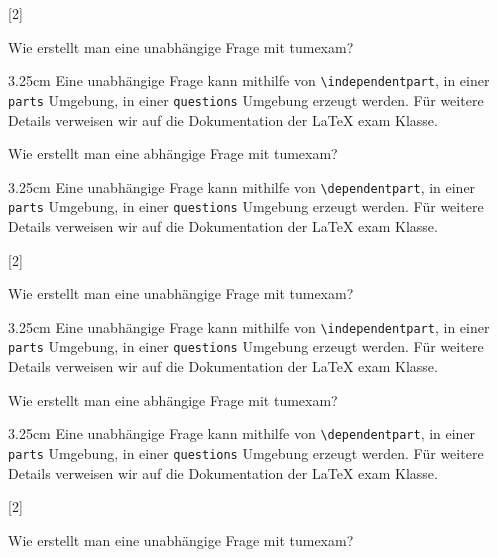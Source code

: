 \documentclass[german, @CLASSOPTIONS@]{tumexam}
\begin{document}
\begin{questions}
\begin{parts}
  \end{parts}
  \clearpage
  [2]
  \begin{parts}
    \independentpart
    Wie erstellt man eine unabhängige Frage mit tumexam?
    \begin{solutionbox}{3.25cm}
      Eine unabhängige Frage kann mithilfe von \texttt{\textbackslash{independentpart}}, in einer \texttt{parts} Umgebung, in einer \texttt{questions} Umgebung erzeugt werden. Für weitere Details verweisen wir auf die Dokumentation der \LaTeX{} exam Klasse.
    \end{solutionbox}
    \dependentpart
    Wie erstellt man eine abhängige Frage mit tumexam?
    \begin{solutionbox}{3.25cm}
      Eine unabhängige Frage kann mithilfe von \texttt{\textbackslash{dependentpart}}, in einer \texttt{parts} Umgebung, in einer \texttt{questions} Umgebung erzeugt werden. Für weitere Details verweisen wir auf die Dokumentation der \LaTeX{} exam Klasse.
    \end{solutionbox}
  \end{parts}
  \clearpage
  [2]
  \begin{parts}
    \independentpart
    Wie erstellt man eine unabhängige Frage mit tumexam?
    \begin{solutionbox}{3.25cm}
      Eine unabhängige Frage kann mithilfe von \texttt{\textbackslash{independentpart}}, in einer \texttt{parts} Umgebung, in einer \texttt{questions} Umgebung erzeugt werden. Für weitere Details verweisen wir auf die Dokumentation der \LaTeX{} exam Klasse.
    \end{solutionbox}
    \dependentpart
    Wie erstellt man eine abhängige Frage mit tumexam?
    \begin{solutionbox}{3.25cm}
      Eine unabhängige Frage kann mithilfe von \texttt{\textbackslash{dependentpart}}, in einer \texttt{parts} Umgebung, in einer \texttt{questions} Umgebung erzeugt werden. Für weitere Details verweisen wir auf die Dokumentation der \LaTeX{} exam Klasse.
    \end{solutionbox}
  \end{parts}
  \clearpage
  [2]
  \begin{parts}
    \independentpart
    Wie erstellt man eine unabhängige Frage mit tumexam?

\end{parts}
\end{questions}
\end{document}
